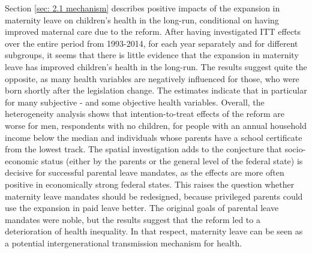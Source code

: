 \documentclass[a4paper ]{article}
\begin{document}
Section \ref{sec: 2.1 mechanism} describes positive impacts of the expansion in maternity leave on children's health in the long-run, conditional on having improved maternal care due to the reform. After having investigated ITT effects over the entire period from 1993-2014, for each year separately and for different subgroups, it seems that there is little evidence that the expansion in maternity leave has improved children's health in the long-run. The results suggest quite the opposite, as many health variables are negatively influenced for those, who were born shortly after the legislation change. The estimates indicate that in particular for many subjective - and some objective health variables.\newline
Overall, the heterogeneity analysis shows that intention-to-treat effects of the reform are worse for men, respondents with no children, for people with an annual household income below the median and individuals whose parents have a school certificate from the lowest track. The spatial investigation adds to the conjecture that socio-economic status (either by the parents or the general level of the federal state) is decisive for successful parental leave mandates, as the effects are more often positive in economically strong federal states. This raises the question whether maternity leave mandates should be redesigned, because privileged parents could use the expansion in paid leave better. The original goals of parental leave mandates were noble, but the results suggest that the reform led to a deterioration of health inequality. In that respect, maternity leave can be seen as a potential intergenerational transmission mechanism for health.






% 
\end{document}
